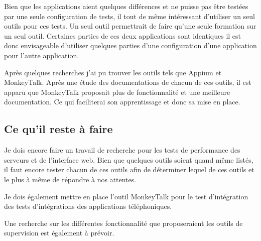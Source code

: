 Bien que les applications aient quelques différences et ne puisse pas être testées par une seule configuration de tests, il tout de même intéressant d'utiliser un seul outils pour ces tests. Un seul outil permettrait de faire qu'une seule formation sur un seul outil. Certaines parties de ces deux applications sont identiques il est donc envisageable d'utiliser quelques parties d'une configuration d'une application pour l'autre application.

Après quelques recherches j'ai pu trouver les outils tels que Appium et MonkeyTalk. Après une étude des documentations de chacun de ces outils, il est apparu que MonkeyTalk proposait plus de fonctionnalité et une meilleure documentation. Ce qui faciliterai son apprentissage et donc sa mise en place.


\subsection{Ce qu'il reste à faire}

Je dois encore faire un travail de recherche pour les tests de performance des serveurs et de l'interface web. Bien que quelques outils soient quand même listés, il faut encore tester chacun de ces outils afin de déterminer lequel de ces outils et le plus à même de répondre à nos attentes.

Je dois également mettre en place l'outil MonkeyTalk pour le test d'intégration des tests d'intégrations des applications téléphoniques.

Une recherche sur les différentes fonctionnalité que proposeraient les outils de supervision est également à prévoir. 